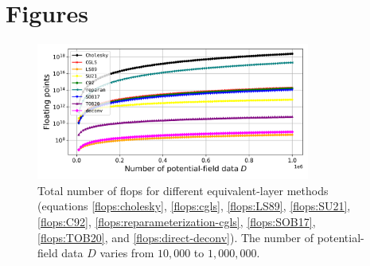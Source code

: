 





%





\section{Figures}

\begin{figure}[htbp]
\begin{center}
\includegraphics[width=9cm]{Fig/flops}%
\end{center}
\caption{
	Total number of flops for different equivalent-layer methods
	(equations \ref{flops:cholesky}, \ref{flops:cgls}, \ref{flops:LS89}, \ref{flops:SU21}, 
	\ref{flops:C92}, \ref{flops:reparameterization-cgls}, \ref{flops:SOB17}, \ref{flops:TOB20},
	and \ref{flops:direct-deconv}). 
	The number of potential-field data $D$ varies from $10,000$ to $1,000,000$.
	}
\label{fig:flops}
\end{figure}

